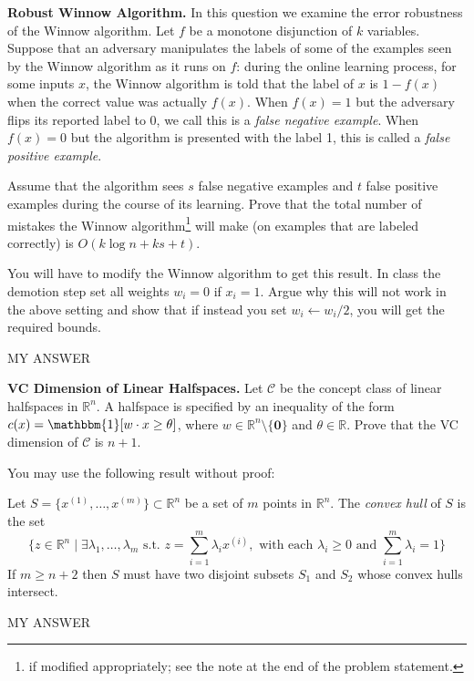 \documentclass[11pt]{article}
\newcommand*{\C}{{\mathcal C}}
\newcommand*{\R}{\mathbb{R}}
\DeclareMathOperator{\1}{\mathbbm{1}}
\begin{document}
\begin{problem}[15 points] \textbf{Robust Winnow Algorithm.}
	In this question we examine the error robustness of the Winnow algorithm. Let $f$ be a monotone disjunction of $k$ variables. Suppose that an adversary manipulates the labels of some of the examples seen by the Winnow algorithm as it runs on $f$: during the online learning process, for some inputs $x$, the Winnow algorithm is told that the label of $x$ is $1-f(x)$ when the correct value was actually $f(x)$. When $f(x) = 1$ but the adversary flips its reported label to 0, we call this is a \emph{false negative example}. When $f(x) = 0$ but the algorithm is presented with the label 1, this is called a \emph{false positive example}.
	
Assume that the algorithm sees $s$ false negative examples and $t$ false positive examples during the course of its learning. Prove that the total number of mistakes the Winnow algorithm\footnote{if modified appropriately; see the note at the end of the problem statement.} will make (on examples that are labeled correctly) is $O(k \log{n} + ks + t)$.
\end{problem}
\begin{note}
	You will have to modify the Winnow algorithm to get this result. In class
	the demotion step set all weights $w_i = 0$ if $x_i = 1$. Argue why this will
	not work in the above setting and show that if instead you set $w_i \leftarrow
	w_i/2$, you will get the required bounds.
\end{note}

MY ANSWER


\begin{problem} [15pts] \textbf{VC Dimension of Linear Halfspaces.}
	Let $\C$ be the concept class of linear halfspaces in $\R^n$. A halfspace is specified by an inequality of the form $c(x) = \1[w \cdot x \geq \theta]$, where $w \in \R^n\setminus\{\mathbf{0}\}$ and $\theta \in \R$. Prove that the VC dimension of $\C$ is $n+1$.
\end{problem}
\begin{note}
	You may use the following result without proof:
	\begin{theorem}
		Let $S =
		\{x^{(1)},\dots,x^{(m)}\} \subset \R^n$ be a set of $m$
		points in $\R^n.$  The {\em convex hull} of $S$ is the set
		\[
		\{ z \in \R^n \mid \exists \lambda_1,\ldots,\lambda_m \text{\ s.t.\ } z = \sum_{i=1}^m \lambda_i x^{(i)}, \text{\ with each\ }\lambda_i \geq 0 \text{\ and\ } \sum_{i=1}^m \lambda_i = 1\}
		\] 
		If $m \geq n+2$ then $S$ must have two disjoint subsets
		$S_1$ and $S_2$ whose convex hulls intersect.
	\end{theorem}
\end{note}

MY ANSWER
\end{document}
